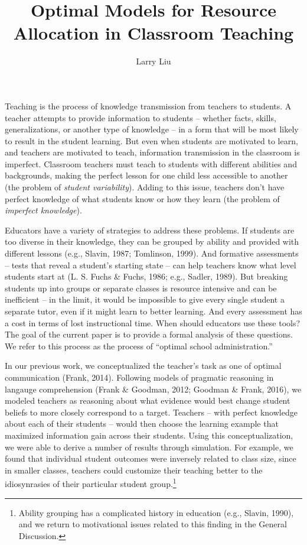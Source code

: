 \documentclass[man]{apa6}
\date{}
\title{\textbf{Optimal Models for Resource Allocation in Classroom Teaching}}
\author{Larry Liu}
\affiliation{Department of Psychology, Stanford University}
\begin{document}
\maketitle

Teaching is the process of knowledge transmission from teachers to
students. A teacher attempts to provide information to students --
whether facts, skills, generalizations, or another type of knowledge --
in a form that will be most likely to result in the student learning.
But even when students are motivated to learn, and teachers are
motivated to teach, information transmission in the classroom is
imperfect. Classroom teachers must teach to students with different
abilities and backgrounds, making the perfect lesson for one child less
accessible to another (the problem of \emph{student variability}).
Adding to this issue, teachers don't have perfect knowledge of what
students know or how they learn (the problem of \emph{imperfect
knowledge}).

Educators have a variety of strategies to address these problems. If
students are too diverse in their knowledge, they can be grouped by
ability and provided with different lessons (e.g., Slavin, 1987;
Tomlinson, 1999). And formative assessments -- tests that reveal a
student's starting state -- can help teachers know what level students
start at (L. S. Fuchs \& Fuchs, 1986; e.g., Sadler, 1989). But breaking
students up into groups or separate classes is resource intensive and
can be inefficient -- in the limit, it would be impossible to give every
single student a separate tutor, even if it might learn to better
learning. And every assessment has a cost in terms of lost instructional
time. When should educators use these tools? The goal of the current
paper is to provide a formal analysis of these questions. We refer to
this process as the process of ``optimal school administration.''

In our previous work, we conceptualized the teacher's task as one of
optimal communication (Frank, 2014). Following models of pragmatic
reasoning in langauge comprehension (Frank \& Goodman, 2012; Goodman \&
Frank, 2016), we modeled teachers as reasoning about what evidence would
best change student beliefs to more closely correspond to a target.
Teachers -- with perfect knowledge about each of their students -- would
then choose the learning example that maximized information gain across
their students. Using this conceptualization, we were able to derive a
number of results through simulation. For example, we found that
individual student outcomes were inversely related to class size, since
in smaller classes, teachers could customize their teaching better to
the idiosynrasies of their particular student group.\footnote{Ability
  grouping has a complicated history in education (e.g., Slavin, 1990),
  and we return to motivational issues related to this finding in the
  General Discussion.}
\end{document}
